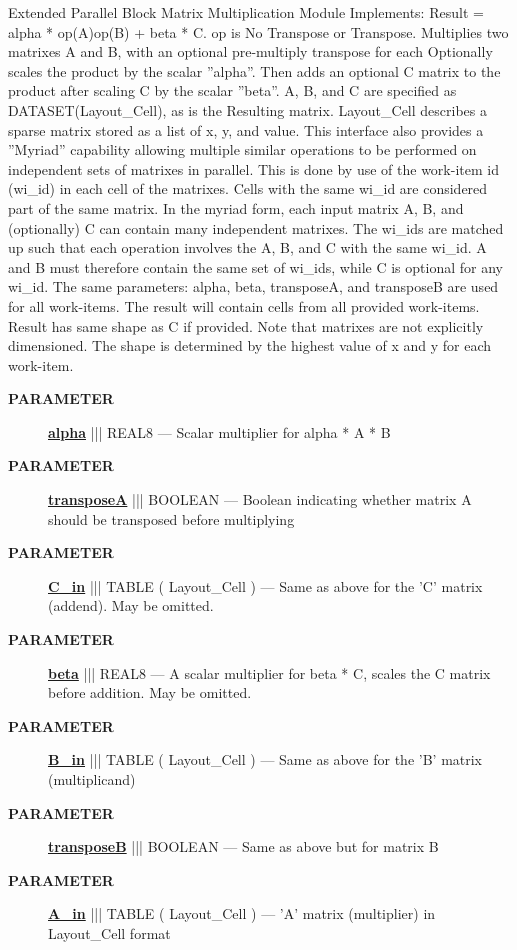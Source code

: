 Extended Parallel Block Matrix Multiplication Module Implements: Result = alpha * op(A)op(B) + beta * C. op is No Transpose or Transpose. Multiplies two matrixes A and B, with an optional pre-multiply transpose for each Optionally scales the product by the scalar ''alpha''. Then adds an optional C matrix to the product after scaling C by the scalar ''beta''. A, B, and C are specified as DATASET(Layout\_Cell), as is the Resulting matrix. Layout\_Cell describes a sparse matrix stored as a list of x, y, and value. This interface also provides a ''Myriad'' capability allowing multiple similar operations to be performed on independent sets of matrixes in parallel. This is done by use of the work-item id (wi\_id) in each cell of the matrixes. Cells with the same wi\_id are considered part of the same matrix. In the myriad form, each input matrix A, B, and (optionally) C can contain many independent matrixes. The wi\_ids are matched up such that each operation involves the A, B, and C with the same wi\_id. A and B must therefore contain the same set of wi\_ids, while C is optional for any wi\_id. The same parameters: alpha, beta, transposeA, and transposeB are used for all work-items. The result will contain cells from all provided work-items. Result has same shape as C if provided. Note that matrixes are not explicitly dimensioned. The shape is determined by the highest value of x and y for each work-item.






\par
\begin{description}
\item [\colorbox{tagtype}{\color{white} \textbf{\textsf{PARAMETER}}}] \textbf{\underline{alpha}} ||| REAL8 --- Scalar multiplier for alpha * A * B
\item [\colorbox{tagtype}{\color{white} \textbf{\textsf{PARAMETER}}}] \textbf{\underline{transposeA}} ||| BOOLEAN --- Boolean indicating whether matrix A should be transposed before multiplying
\item [\colorbox{tagtype}{\color{white} \textbf{\textsf{PARAMETER}}}] \textbf{\underline{C\_in}} ||| TABLE ( Layout\_Cell ) --- Same as above for the 'C' matrix (addend). May be omitted.
\item [\colorbox{tagtype}{\color{white} \textbf{\textsf{PARAMETER}}}] \textbf{\underline{beta}} ||| REAL8 --- A scalar multiplier for beta * C, scales the C matrix before addition. May be omitted.
\item [\colorbox{tagtype}{\color{white} \textbf{\textsf{PARAMETER}}}] \textbf{\underline{B\_in}} ||| TABLE ( Layout\_Cell ) --- Same as above for the 'B' matrix (multiplicand)
\item [\colorbox{tagtype}{\color{white} \textbf{\textsf{PARAMETER}}}] \textbf{\underline{transposeB}} ||| BOOLEAN --- Same as above but for matrix B
\item [\colorbox{tagtype}{\color{white} \textbf{\textsf{PARAMETER}}}] \textbf{\underline{A\_in}} ||| TABLE ( Layout\_Cell ) --- 'A' matrix (multiplier) in Layout\_Cell format
\end{description}







